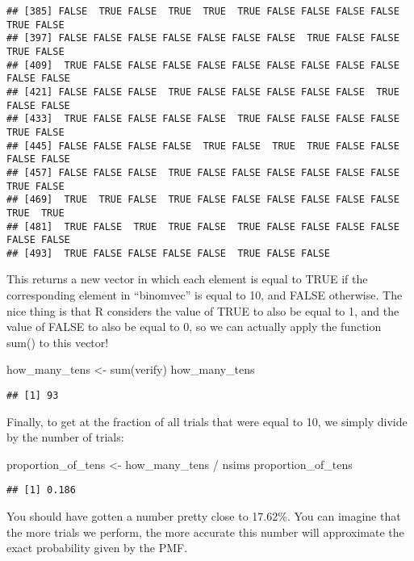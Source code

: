 \documentclass[
]{book}
\newenvironment{Shaded}{\begin{snugshade}}{\end{snugshade}}
\newcommand{\FunctionTok}[1]{\textcolor[rgb]{0.00,0.00,0.00}{#1}}
\newcommand{\NormalTok}[1]{#1}
\newcommand{\OtherTok}[1]{\textcolor[rgb]{0.56,0.35,0.01}{#1}}
\newcommand{\SpecialCharTok}[1]{\textcolor[rgb]{0.00,0.00,0.00}{#1}}
\begin{document}
\begin{verbatim}
## [385] FALSE  TRUE FALSE  TRUE  TRUE  TRUE FALSE FALSE FALSE FALSE  TRUE FALSE
## [397] FALSE FALSE FALSE FALSE FALSE FALSE FALSE  TRUE FALSE FALSE  TRUE FALSE
## [409]  TRUE FALSE FALSE FALSE FALSE FALSE FALSE FALSE FALSE FALSE FALSE FALSE
## [421] FALSE FALSE FALSE  TRUE FALSE FALSE FALSE FALSE FALSE  TRUE FALSE FALSE
## [433]  TRUE FALSE FALSE FALSE FALSE  TRUE FALSE FALSE FALSE FALSE  TRUE FALSE
## [445] FALSE FALSE FALSE FALSE  TRUE FALSE  TRUE  TRUE FALSE FALSE FALSE FALSE
## [457] FALSE FALSE FALSE  TRUE FALSE FALSE FALSE FALSE FALSE FALSE  TRUE FALSE
## [469]  TRUE  TRUE FALSE  TRUE FALSE FALSE FALSE FALSE FALSE FALSE  TRUE  TRUE
## [481]  TRUE FALSE  TRUE  TRUE FALSE  TRUE FALSE FALSE FALSE FALSE FALSE FALSE
## [493]  TRUE FALSE FALSE FALSE FALSE  TRUE FALSE FALSE
\end{verbatim}

This returns a new vector in which each element is equal to TRUE if the corresponding element in ``binomvec'' is equal to 10, and FALSE otherwise. The nice thing is that R considers the value of TRUE to also be equal to 1, and the value of FALSE to also be equal to 0, so we can actually apply the function sum() to this vector!

\begin{Shaded}
\begin{Highlighting}[]
\NormalTok{how\_many\_tens }\OtherTok{\textless{}{-}} \FunctionTok{sum}\NormalTok{(verify)}
\NormalTok{how\_many\_tens}
\end{Highlighting}
\end{Shaded}

\begin{verbatim}
## [1] 93
\end{verbatim}

Finally, to get at the fraction of all trials that were equal to 10, we simply divide by the number of trials:

\begin{Shaded}
\begin{Highlighting}[]
\NormalTok{proportion\_of\_tens }\OtherTok{\textless{}{-}}\NormalTok{ how\_many\_tens }\SpecialCharTok{/}\NormalTok{ nsims}
\NormalTok{proportion\_of\_tens}
\end{Highlighting}
\end{Shaded}

\begin{verbatim}
## [1] 0.186
\end{verbatim}

You should have gotten a number pretty close to 17.62\%. You can imagine that the more trials we perform, the more accurate this number will approximate the exact probability given by the PMF.
\end{document}
